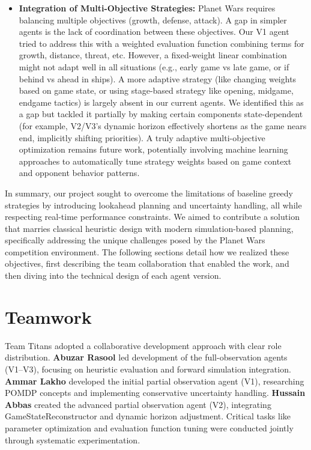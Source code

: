 \documentclass[conference]{IEEEtran}
\begin{document}
\begin{itemize}
\item \textbf{Integration of Multi-Objective Strategies:} Planet Wars requires balancing multiple objectives (growth, defense, attack). A gap in simpler agents is the lack of coordination between these objectives. Our V1 agent tried to address this with a weighted evaluation function combining terms for growth, distance, threat, etc. However, a fixed-weight linear combination might not adapt well in all situations (e.g., early game vs late game, or if behind vs ahead in ships). A more adaptive strategy (like changing weights based on game state, or using stage-based strategy like opening, midgame, endgame tactics) is largely absent in our current agents. We identified this as a gap but tackled it partially by making certain components state-dependent (for example, V2/V3's dynamic horizon effectively shortens as the game nears end, implicitly shifting priorities). A truly adaptive multi-objective optimization remains future work, potentially involving machine learning approaches to automatically tune strategy weights based on game context and opponent behavior patterns.
\end{itemize}

In summary, our project sought to overcome the limitations of baseline greedy strategies by introducing lookahead planning and uncertainty handling, all while respecting real-time performance constraints. We aimed to contribute a solution that marries classical heuristic design with modern simulation-based planning, specifically addressing the unique challenges posed by the Planet Wars competition environment. The following sections detail how we realized these objectives, first describing the team collaboration that enabled the work, and then diving into the technical design of each agent version.

\section{Teamwork}

Team Titans adopted a collaborative development approach with clear role distribution. \textbf{Abuzar Rasool} led development of the full-observation agents (V1--V3), focusing on heuristic evaluation and forward simulation integration. \textbf{Ammar Lakho} developed the initial partial observation agent (V1), researching POMDP concepts and implementing conservative uncertainty handling. \textbf{Hussain Abbas} created the advanced partial observation agent (V2), integrating GameStateReconstructor and dynamic horizon adjustment. Critical tasks like parameter optimization and evaluation function tuning were conducted jointly through systematic experimentation.
\end{document}
